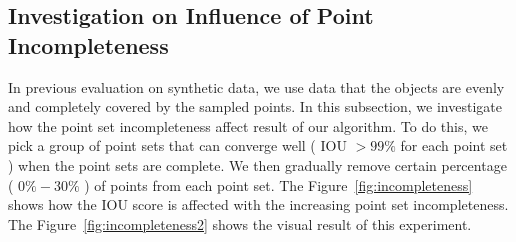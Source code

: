 \subsection{Investigation on Influence of Point Incompleteness}
In previous evaluation on synthetic data, we use data that the objects are evenly and completely covered by the sampled points. In this subsection, we investigate how the point set incompleteness affect result of our algorithm. To do this, we pick a group of point sets that can converge well ( IOU $> 99\%$ for each point set ) when the point sets are complete. We then gradually remove certain percentage ( $0\%-30\%$ ) of points from each point set. The Figure~\ref{fig:incompleteness} shows how the IOU score is affected with the increasing point set incompleteness. The Figure~\ref{fig:incompleteness2} shows the visual result of this experiment. 

